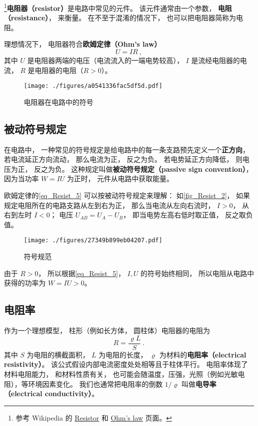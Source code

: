 

\footnote{参考 Wikipedia 的 \href{https://en.wikipedia.org/wiki/Resistor}{Resistor} 和 \href{https://en.wikipedia.org/wiki/Ohm's_law}{Ohm's law} 页面。}\textbf{电阻器（resistor）}是电路中常见的元件。 该元件通常由一个参数， \textbf{电阻（resistance）}， 来衡量。 在不至于混淆的情况下， 也可以把电阻器简称为电阻。

理想情况下， 电阻器符合\textbf{欧姆定律（Ohm's law）}
\begin{equation}\label{eq_Resist_5}
U = IR~,
\end{equation}
其中 $U$ 是电阻器两端的电压（电流流入的一端电势较高）， $I$ 是流经电阻器的电流， $R$ 是电阻器的电阻（$R > 0$）。

\begin{figure}[ht]
\centering
\texttt{[image: ./figures/a0541336fac5df5d.pdf]}
\caption{电阻器在电路中的符号} \label{fig_Resist_3}
\end{figure}

\subsection{被动符号规定}\label{sub_Resist_1}
在电路中， 一种常见的符号规定是给电路中的每一条支路预先定义一个\textbf{正方向}， 若电流延正方向流动， 那么电流为正， 反之为负。 若电势延正方向降低， 则电压为正， 反之为负。 这种规定叫做\textbf{被动符号规定（passive sign convention）}， 因为当功率 $W = IU$ 为正时， 元件从电路中获取能量。

欧姆定律的\autoref{eq_Resist_5} 可以按被动符号规定来理解： 如\autoref{fig_Resist_2}， 如果规定电阻所在的电路支路从左到右为正， 那么当电流从左向右流时， $I > 0$， 从右到左时 $I < 0$； 电压 $U_{AB} = U_A - U_B$， 即当电势左高右低时取正值， 反之取负值。

\begin{figure}[ht]
\centering
\texttt{[image: ./figures/27349b899eb04207.pdf]}
\caption{符号规范} \label{fig_Resist_2}
\end{figure}

由于 $R > 0$， 所以根据\autoref{eq_Resist_5}， $I, U$ 的符号始终相同， 所以电阻从电路中获得的功率为 $W = IU > 0$。

\subsection{电阻率}
作为一个理想模型， 柱形（例如长方体， 圆柱体）电阻器的电阻为
\begin{equation}\label{eq_Resist_7}
R = \frac{\varrho L}{S} ~.
\end{equation}
其中 $S$ 为电阻的横截面积， $L$ 为电阻的长度， $\varrho$ 为材料的\textbf{电阻率（electrical resistivity）}。 该公式假设内部电流密度处处相等且于柱体平行。 电阻率体现了材料电阻能力， 和材料性质有关， 也可能会随温度，压强，光照（例如光敏电阻），等环境因素变化。 我们也通常把电阻率的倒数 $1/\varrho$ 叫做\textbf{电导率（electrical conductivity）}。

